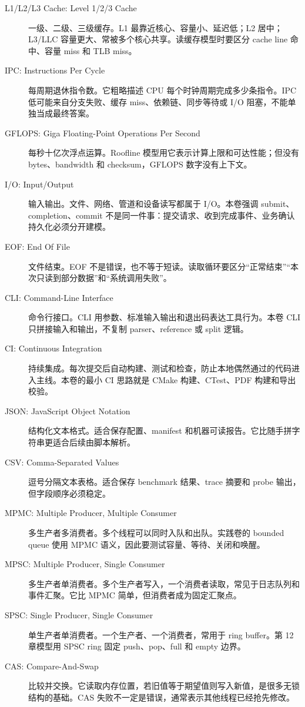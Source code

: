 \begin{description}
  \item[L1/L2/L3 Cache: Level 1/2/3 Cache] 一级、二级、三级缓存。L1 最靠近核心、容量小、延迟低；L2 居中；L3/LLC 容量更大、常被多个核心共享。读缓存模型时要区分 cache line 命中、容量 miss 和 TLB miss。
  \item[IPC: Instructions Per Cycle] 每周期退休指令数。它粗略描述 CPU 每个时钟周期完成多少条指令。IPC 低可能来自分支失败、缓存 miss、依赖链、同步等待或 I/O 阻塞，不能单独当成最终答案。
  \item[GFLOPS: Giga Floating-Point Operations Per Second] 每秒十亿次浮点运算。Roofline 模型用它表示计算上限和可达性能；但没有 bytes、bandwidth 和 checksum，GFLOPS 数字没有上下文。
  \item[I/O: Input/Output] 输入输出。文件、网络、管道和设备读写都属于 I/O。本卷强调 submit、completion、commit 不是同一件事：提交请求、收到完成事件、业务确认持久化必须分开建模。
  \item[EOF: End Of File] 文件结束。EOF 不是错误，也不等于短读。读取循环要区分“正常结束”“本次只读到部分数据”和“系统调用失败”。
  \item[CLI: Command-Line Interface] 命令行接口。CLI 用参数、标准输入输出和退出码表达工具行为。本卷 CLI 只拼接输入和输出，不复制 parser、reference 或 split 逻辑。
  \item[CI: Continuous Integration] 持续集成。每次提交后自动构建、测试和检查，防止本地偶然通过的代码进入主线。本卷的最小 CI 思路就是 CMake 构建、CTest、PDF 构建和导出校验。
  \item[JSON: JavaScript Object Notation] 结构化文本格式。适合保存配置、manifest 和机器可读报告。它比随手拼字符串更适合后续由脚本解析。
  \item[CSV: Comma-Separated Values] 逗号分隔文本表格。适合保存 benchmark 结果、trace 摘要和 probe 输出，但字段顺序必须稳定。
  \item[MPMC: Multiple Producer, Multiple Consumer] 多生产者多消费者。多个线程可以同时入队和出队。实践卷的 bounded queue 使用 MPMC 语义，因此要测试容量、等待、关闭和唤醒。
  \item[MPSC: Multiple Producer, Single Consumer] 多生产者单消费者。多个生产者写入，一个消费者读取，常见于日志队列和事件汇聚。它比 MPMC 简单，但消费者成为固定汇聚点。
  \item[SPSC: Single Producer, Single Consumer] 单生产者单消费者。一个生产者、一个消费者，常用于 ring buffer。第 12 章模型用 SPSC ring 固定 push、pop、full 和 empty 边界。
  \item[CAS: Compare-And-Swap] 比较并交换。它读取内存位置，若旧值等于期望值则写入新值，是很多无锁结构的基础。CAS 失败不一定是错误，通常表示其他线程已经抢先修改。

\end{description}
